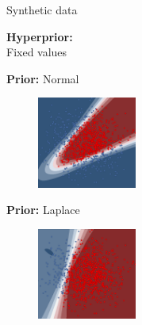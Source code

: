 \documentclass{beamer}
\begin{document}
\begin{frame}{Synthetic data}
	\begin{minipage}[t]{0.32\columnwidth}
	\vspace{0.6cm}
	\textbf{Hyperprior:} \\Fixed values
	\end{minipage}
	\begin{minipage}[t]{0.32\columnwidth}
		\centering
		\textbf{Prior:} Normal
		\begin{figure}
			\includegraphics[height=3cm]{pres_pics/p_gauss.png}
		\end{figure}
	\end{minipage}
	\begin{minipage}[t]{0.32\columnwidth}
		\centering
		\textbf{Prior:} Laplace
		\vspace{-0.075cm}
		\begin{figure}
			\includegraphics[height=3cm]{pres_pics/p_laplace.png}
		\end{figure}
	\end{minipage}
	
	\vfill
	

\end{frame}
\end{document}
